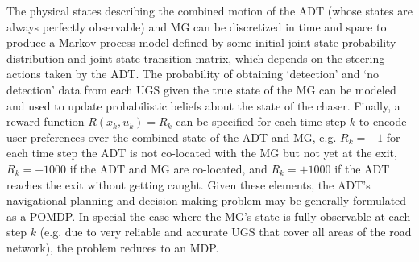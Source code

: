 The physical states describing the combined motion of the ADT (whose states are always perfectly observable) and MG can be discretized in time and space to produce a Markov process model defined by some initial joint state probability distribution and joint state transition matrix, which depends on the steering actions taken by the ADT. The probability of obtaining `detection' and `no detection' data from each UGS given the true state of the MG can be modeled and used to update probabilistic beliefs about the state of the chaser. Finally, a reward function $R(x_k,u_k) = R_k$ can be specified for each time step $k$ to encode user preferences over the combined state of the ADT and MG, e.g. $R_k = -1$ for each time step the ADT is not co-located with the MG but not yet at the exit, $R_k= -1000$ if the ADT and MG are co-located, and $R_k=+1000$ if the ADT reaches the exit without getting caught. Given these elements, the ADT's navigational planning and decision-making problem may be generally formulated as a POMDP. In special the case where the MG's state is fully observable at each step $k$ (e.g. due to very reliable and accurate UGS that cover all areas of the road network), the problem reduces to an MDP. 
